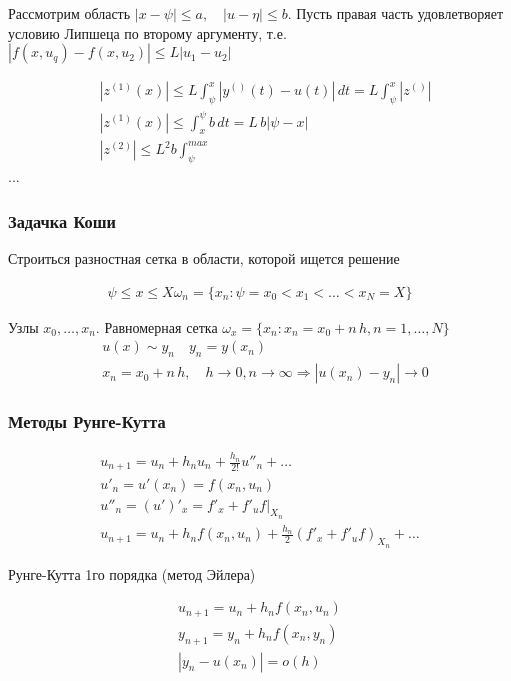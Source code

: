 Рассмотрим область $	|x - \psi | \leq a, \quad |u - \eta| \leq b$. Пусть правая часть удовлетворяет условию Липшеца по второму аргументу, т.е. $|f(x, u_q) - f(x, u_2)| \leq L |u_1 - u_2|$

\begin{align*}
	&|z^{(1)}(x)| \leq L \int_{\psi}^{x} |y^{()}(t) - u(t)|\, dt = L \int_{\psi}^{x} |z^{()}|
	\\
	&|z^{(1)}(x)| \leq \int_{x}^{\psi} b\, dt = L\, b|\psi - x|
	\\
	&|z^{(2)}| \leq L^2 b\int_{\psi}^{max}
\end{align*}
...

\subsubsection{Задачка Коши}

Строиться разностная сетка в области, которой ищется решение

\begin{align*}
  \psi \leq x \leq X
	\omega_n = \{ x_n: \psi=x_0 < x_1 < \dots < x_N = X \}
\end{align*}

Узлы $x_0, \dots, x_n$. Равномерная сетка $\omega_x = \{ x_n: x_n = x_0 + n\,h, n = 1, \dots, N \}$
\begin{align*}
	&u(x) \sim y_n \quad y_n = y(x_n)
	\\
	&x_n = x_0 + n\,h, \quad h \to 0, n \to \infty \Rightarrow |u(x_n) - y_n| \to 0
\end{align*}


\subsubsection{Методы Рунге-Кутта}

\begin{align*}
	u_{n+1} = u_n + h_n u_n + \frac{h_n}{2!} u''_n + \dots
	\\
	u'_n = u'(x_n) = f(x_n, u_n)
	\\
	u''_n = (u')'_x = f'_x + f'_u f |_{X_n}
	\\
	u_{n+1} = u_n + h_n f(x_n, u_n) + \frac{h_n}{2}(f'_x + f'_u f)_{X_n} + \dots
\end{align*}

Рунге-Кутта 1го порядка (метод Эйлера)

\begin{align*}
	u_{n+1} = u_n + h_n f(x_n, u_n)
	\\
	y_{n+1} = y_n + h_n f(x_n, y_n)
	\\
	|y_n - u(x_n)| = o(h)
\end{align*}

